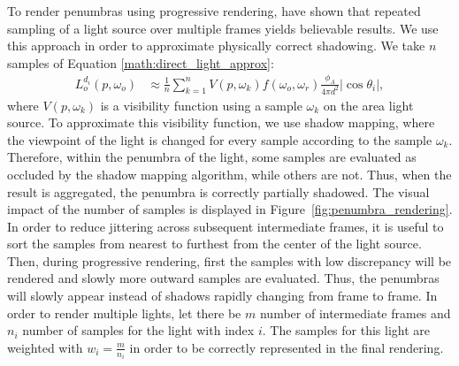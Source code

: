 \documentclass[sigconf,authorversion]{acmart}
\begin{document}
To render penumbras using progressive rendering, \cite{limberger2016progressive} have shown that repeated sampling of a light source over multiple frames yields believable results.
We use this approach in order to approximate physically correct shadowing.
We take $n$ samples of Equation \ref{math:direct_light_approx}:
\begin{align}
    L_o^{d_i}(p, \omega_o) &\approx \frac{1}{n} \sum_{k=1}^n V(p, \omega_k) f(\omega_o, \omega_r) \frac{\phi_A}{4 \pi d^2} \left|\cos \theta_i\right|,
\end{align}
where $V(p, \omega_k)$ is a visibility function using a sample $\omega_k$ on the area light source.
To approximate this visibility function, we use shadow mapping, where the viewpoint of the light is changed for every sample according to the sample $\omega_k$.
Therefore, within the penumbra of the light, some samples are evaluated as occluded by the shadow mapping algorithm, while others are not.
Thus, when the result is aggregated, the penumbra is correctly partially shadowed.
The visual impact of the number of samples is displayed in Figure~\ref{fig:penumbra_rendering}.
In order to reduce jittering across subsequent intermediate frames, it is useful to sort the samples from nearest to furthest from the center of the light source.
Then, during progressive rendering, first the samples with low discrepancy will be rendered and slowly more outward samples are evaluated.
Thus, the penumbras will slowly appear instead of shadows rapidly changing from frame to frame.
In order to render multiple lights, let there be $m$ number of intermediate frames and $n_i$ number of samples for the light with index $i$.
The samples for this light are weighted with $w_i = \frac{m}{n_i}$ in order to be correctly represented in the final rendering.
\end{document}
